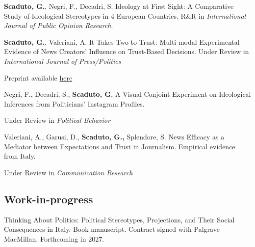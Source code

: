 \documentclass[10pt,]{article}
\providecommand{\tightlist}{%
  \setlength{\itemsep}{0pt}\setlength{\parskip}{0pt}}
\renewenvironment{itemize}{
  \begin{list}{}{
    \setlength{\leftmargin}{1.5em}
  }
}{
  \end{list}
}
\begin{document}
\begin{itemize}
\tightlist
\item
  \textbf{Scaduto, G.}, Negri, F., Decadri, S. Ideology at First Sight:
  A Comparative Study of Ideological Stereotypes in 4 European
  Countries. R\&R in \emph{International Journal of Public Opinion
  Research}.
\end{itemize}

\begin{itemize}
\tightlist
\item
  \textbf{Scaduto, G.}, Valeriani, A. It Takes Two to Trust: Multi-modal
  Experimental Evidence of News Creators' Influence on Trust-Based
  Decisions. Under Review in \emph{International Journal of
  Press/Politics}

  \begin{itemize}
  \tightlist
  \item
    Preprint available
    \href{https://osf.io/preprints/socarxiv/tb6gh_v1}{here}
  \end{itemize}
\item
  Negri, F., Decadri, S., \textbf{Scaduto, G.} A Visual Conjoint
  Experiment on Ideological Inferences from Politicians' Instagram
  Profiles.

  \begin{itemize}
  \tightlist
  \item
    Under Review in \emph{Political Behavior}
  \end{itemize}
\item
  Valeriani, A., Garusi, D., \textbf{Scaduto, G.,} Splendore, S. News
  Efficacy as a Mediator between Expectations and Trust in Journalism.
  Empirical evidence from Italy.

  \begin{itemize}
  \tightlist
  \item
    Under Review in \emph{Communication Research}
  \end{itemize}
\end{itemize}

\subsection{Work-in-progress}\label{work-in-progress}

\begin{itemize}
\tightlist
\item
  Thinking About Politics: Political Stereotypes, Projections, and Their
  Social Consequences in Italy. Book manuscript. Contract signed with
  Palgrave MacMillan. Forthcoming in 2027.
\end{itemize}
\end{document}
